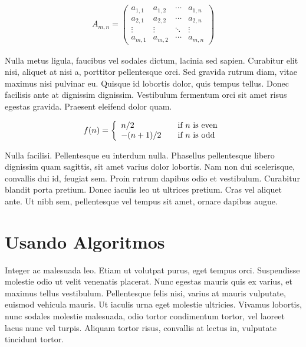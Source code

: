 	\begin{equation}
		\begin{aligned}
			A_{m,n} =
			\begin{pmatrix}
			a_{1,1} & a_{1,2} & \cdots & a_{1,n} \\
			a_{2,1} & a_{2,2} & \cdots & a_{2,n} \\
			\vdots  & \vdots  & \ddots & \vdots  \\
			a_{m,1} & a_{m,2} & \cdots & a_{m,n}
			\end{pmatrix}
		\end{aligned}
	\end{equation}

Nulla metus ligula, faucibus vel sodales dictum, lacinia sed sapien. Curabitur elit nisi, aliquet at nisi a, porttitor pellentesque orci. Sed gravida rutrum diam, vitae maximus nisi pulvinar eu. Quisque id lobortis dolor, quis tempus tellus. Donec facilisis ante at dignissim dignissim. Vestibulum fermentum orci sit amet risus egestas gravida. Praesent eleifend dolor quam.

	\begin{equation}
		\begin{aligned}
			f(n) = \left\{ 
			\begin{array}{l l}
			n/2 & \quad \text{if $n$ is even}\\
			-(n+1)/2 & \quad \text{if $n$ is odd}
			\end{array} \right.
		\end{aligned}
	\end{equation}
	
Nulla facilisi. Pellentesque eu interdum nulla. Phasellus pellentesque libero dignissim quam sagittis, sit amet varius dolor lobortis. Nam non dui scelerisque, convallis dui id, feugiat sem. Proin rutrum dapibus odio et vestibulum. Curabitur blandit porta pretium. Donec iaculis leo ut ultrices pretium. Cras vel aliquet ante. Ut nibh sem, pellentesque vel tempus sit amet, ornare dapibus augue.

\section{Usando Algoritmos}

Integer ac malesuada leo. Etiam ut volutpat purus, eget tempus orci. Suspendisse molestie odio ut velit venenatis placerat. Nunc egestas mauris quis ex varius, et maximus tellus vestibulum. Pellentesque felis nisi, varius at mauris vulputate, euismod vehicula mauris. Ut iaculis urna eget molestie ultricies. Vivamus lobortis, nunc sodales molestie malesuada, odio tortor condimentum tortor, vel laoreet lacus nunc vel turpis. Aliquam tortor risus, convallis at lectus in, vulputate tincidunt tortor.

